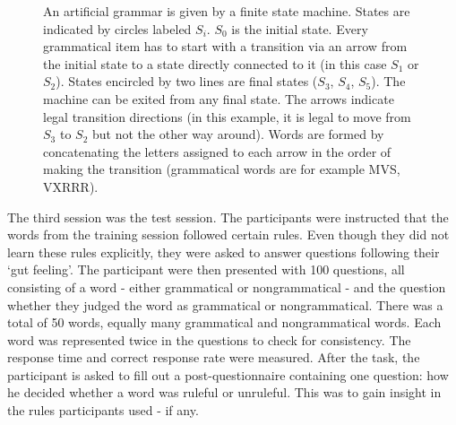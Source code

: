 \begin{figure}
\centering
\hspace*{-1.55cm}
\caption{An artificial grammar is given by a finite state machine. States are indicated by circles labeled $S_{i}$. $S_{0}$ is the initial state. Every grammatical item has to start with a transition via an arrow from the initial state to a state directly connected to it (in this case $S_{1}$ or $S_{2}$). States encircled by two lines are final states ($S_{3}$, $S_{4}$, $S_{5}$). The machine can be exited from any final state. The arrows indicate legal transition directions (in this example, it is legal to move from $S_{3}$ to $S_{2}$ but not the other way around). Words are formed by concatenating the letters assigned to each arrow in the order of making the transition (grammatical words are for example MVS, VXRRR).} 
\label{fig:grammar}
\end{figure}

\noindent The third session was the test session. The participants were instructed that the words from the training session followed certain rules. Even though they did not learn these rules explicitly, they were asked to answer questions following their `gut feeling'. The participant were then presented with 100 questions, all consisting of a word - either grammatical or nongrammatical - and the question whether they judged the word as grammatical or nongrammatical. There was a total of 50 words, equally many grammatical and nongrammatical words. Each word was represented twice in the questions to check for consistency. The response time and correct response rate were measured. After the task, the participant is asked to fill out a post-questionnaire containing one question: how he decided whether a word was ruleful or unruleful. This was to gain insight in the rules participants used - if any.

